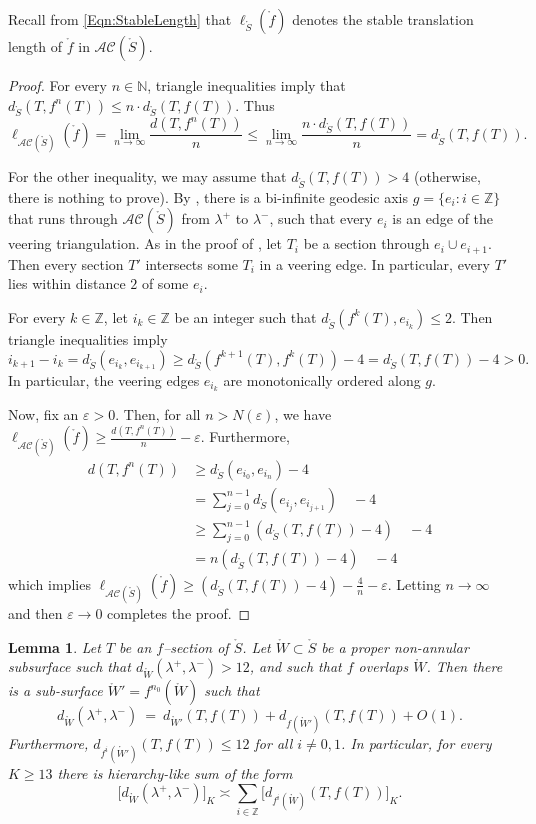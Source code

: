 \documentclass[11pt,letterpaper]{amsart}
\newcommand{\ZZ}[0]{\mathbb{Z}}
\newcommand{\NN}[0]{\mathbb{N}}
\newcommand{\mr}{\mathring}
\newcommand{\psub}{\mr W}
\numberwithin{equation}{section}
\newtheorem{lemma}[theorem]{Lemma}
\theoremstyle{definition}
\newcommand{\AC}{\mathcal{AC}}
\renewcommand{\epsilon}{\varepsilon}
\begin{document}
Recall from \eqref{Eqn:StableLength} that $\ell_{\mr S}(\mr f) $ denotes the stable translation length of $\mr f$ in $\AC(\mr S)$.


\begin{proof}
For every $n \in \NN$, triangle inequalities imply that $d_{\mr S}(T, f^n(T)) \leq n \cdot d_{\mr S}(T, f(T))$.
Thus 
\[
\ell_{\AC(\mr S)}(\mr f) = \lim_{n \to \infty} \frac{d(T, f^n(T))}{n}  \leq \lim_{n \to \infty} \frac{n \cdot d_{\mr S}(T, f(T))}{n} = d_{\mr S}(T, f(T)).
\]

For the other inequality, we may assume that $ d_{\mr S}(T, f(T)) > 4$ (otherwise, there is nothing to prove).
By \cite[Theorem 1.4]{MinskyTaylor:FiberedFaces}, there is a bi-infinite geodesic axis $g = \{e_i : i \in \ZZ\}$ that runs through $\AC(\mr S)$ from $\lambda^+$ to $\lambda^-$, such that every $e_i$ is an edge of the veering triangulation. 
 As in the proof of , let $T_i$ be a section through $e_i \cup e_{i+1}$. Then every section $T'$ intersects some $T_i$ in a veering edge. In particular, every $T'$ lies within distance $2$ of some $e_i$.
 
 For every $k \in \ZZ$, let $i_k \in \ZZ$ be an integer such that $d_{\mr S}(f^k(T), e_{i_k}) \leq 2$. Then triangle inequalities imply
 \[
 i_{k+1} - i_k = d_{\mr S} (e_{i_k}, e_{i_{k+1}}) \geq d_{\mr S}(f^{k+1}(T), f^k(T)) - 4 = d_{\mr S}(T, f(T)) - 4 > 0.
 \]
 In particular, the veering edges $e_{i_k}$ are monotonically ordered along $g$.
 
 Now, fix an $\epsilon > 0$. Then, for all $n > N(\epsilon)$, we have 
 $\ell_{\AC(\mr S)}(\mr f) \geq \frac{d(T, f^n(T))}{n} - \epsilon$. Furthermore,
  \begin{align*}
d(T, f^n(T))
 &\geq d_{\mr S} (e_{i_0}, e_{i_{n}}) - 4 \\
 & = \sum_{j = 0}^{n-1} d_{\mr S} (e_{i_j}, e_{i_{j+1}}) \quad -4 \\
 & \geq \sum_{j = 0}^{n-1} (d_{\mr S}(T, f(T)) - 4) \quad -4 \\
 & = n (d_{\mr S}(T, f(T)) - 4) \quad -4
 \end{align*}
 which implies  $\ell_{\AC(\mr S)}(\mr f) \geq (d_{\mr S}(T, f(T)) - 4) - \frac{4}{n} - \epsilon$.
Letting $n \to \infty$ and then $\epsilon \to 0$ completes the proof.
\end{proof}


\begin{lemma}\label{Lem:fSectionSum}
 Let $T$ be an $f$--section of $\mr S$. Let
 $\psub \subset \mr S$ be a proper non-annular subsurface such that $d_{\psub}(\lambda^+,\lambda^-) > 12$, and such that $f$ overlaps $\psub$.
 Then there is a sub-surface $\psub'  = f^{n_0}(\psub)$ such that
 \[
d_{\psub}(\lambda^+,\lambda^-) \: = \:  d_{\psub'} (T, f(T)) + d_{f(\psub')} (T, f(T))  + O(1).
\]
Furthermore, $d_{f^i(\psub')}(T, f(T)) \leq 12$ for all $i \neq 0,1$. In particular, for every $K \geq 13$ there is hierarchy-like sum of the form 
\[
\big[ d_{\psub}(\lambda^+, \lambda^-) \big]_{K}  \asymp \sum_{i \in \ZZ} \big[ d_{f^i(\psub)}(T, f(T)) \big]_{K}.
\]
\end{lemma}
\end{document}
